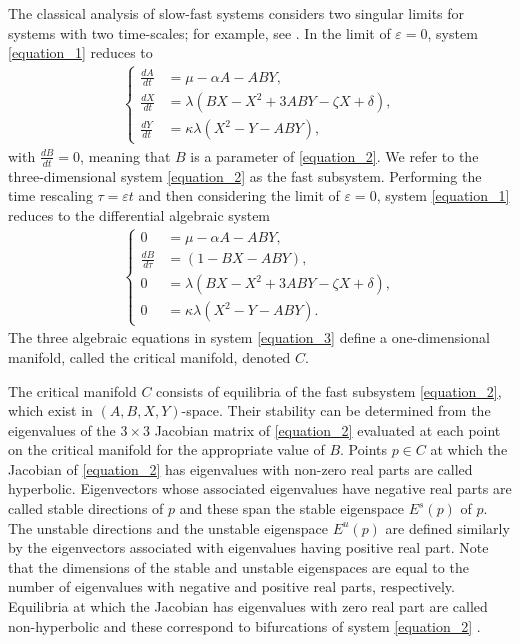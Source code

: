 \documentclass{ws-ijbc}
\begin{document}
The classical analysis of slow-fast systems considers two singular limits for systems with two time-scales; for example, see \cite{MMO}.  In the limit of $\varepsilon = 0$, system \eqref{equation_1} reduces to
%
\begin{equation}
\begin{aligned}
\begin{cases}
\frac{dA}{dt} &= \mu - \alpha A - ABY, \\[1mm]
\frac{dX}{dt} &= \lambda(BX - X^2 +3ABY - \zeta X + \delta), \\[1mm]
\frac{dY}{dt} &= \kappa \lambda(X^2 - Y - ABY),
\end{cases}
\end{aligned}
\label{equation_2}
\end{equation}
%
with $\frac{dB}{dt}=0$, meaning that $B$ is a parameter of \eqref{equation_2}.  We refer to the three-dimensional system \eqref{equation_2} as the fast subsystem.  Performing the time rescaling $\tau = \varepsilon t$ and then considering the limit of $\varepsilon = 0$, system \eqref{equation_1} reduces to the differential algebraic system
%    
\begin{equation}
\begin{aligned}
\begin{cases}
0 &= \mu - \alpha A - ABY, \\[1mm]
\frac{dB}{d\tau} &= (1-BX - ABY), \\[1mm]
0 &= \lambda (BX - X^2 +3ABY - \zeta X + \delta), \\[1mm]
0 &= \kappa \lambda(X^2 - Y - ABY).
\end{cases}
\end{aligned}
\label{equation_3}
\end{equation}
%
The three algebraic equations in system \eqref{equation_3} define a one-dimensional manifold, called the critical manifold, denoted $C$.

The critical manifold $C$ consists of equilibria of the fast subsystem \eqref{equation_2}, which exist in $(A,B,X,Y)$-space.  Their stability can be determined from the eigenvalues of the $3\times3$ Jacobian matrix of \eqref{equation_2} evaluated at each point on the critical manifold for the appropriate value of $B$.  Points $p \in C$ at which the Jacobian of \eqref{equation_2} has eigenvalues with non-zero real parts are called hyperbolic.  Eigenvectors whose associated eigenvalues have negative real parts are called stable directions of $p$ and these span the stable eigenspace $E^{s}(p)$ of $p$.  The unstable directions and the unstable eigenspace $E^{u}(p)$ are defined similarly by the eigenvectors associated with eigenvalues having positive real part.  Note that the dimensions of the stable and unstable eigenspaces are equal to the number of eigenvalues with negative and positive real parts, respectively.  Equilibria at which the Jacobian has eigenvalues with zero real part are called non-hyperbolic and these correspond to bifurcations of system \eqref{equation_2} \cite{The_Kuz} .
\end{document}
